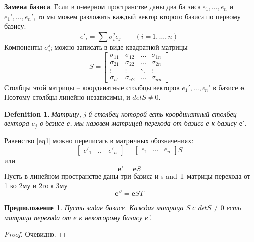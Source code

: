 \documentclass[11pt; a4paper]{report}
\theoremstyle{plain} %
\newtheorem{sug}{Предположение}[section]
\theoremstyle{defenition}
\newtheorem{glob_def}{Defenition}
\theoremstyle{remark}
\begin{document}
\textbf{Замена базиса.} Если в п-мерном пространстве даны два ба­ зиса  $e_1, \ldots, e_n$ и $e_1', \ldots, e_n'$, то мы можем разложить каждый вектор вто­рого базиса по первому базису:
\begin{equation}\label{eq1}
e'_i = \sum \sigma_i^je_j \qquad (i = 1, \ldots, n)
\end{equation}
Компоненты $\sigma_i^j$; можно записать в виде квадратной матрицы 
\begin{equation*}
S =  \begin{bmatrix}
		\sigma_{11} & \sigma_{12} &  \ldots & \sigma_{1n} \\
		\sigma_{21} & \sigma_{22} &  \ldots & \sigma_{2n} \\
		\vdots & \vdots & \ddots & \vdots \\
		\sigma_{n1} & \sigma_{n2} & \ldots & \sigma_{nn} 
	\end{bmatrix} 
\end{equation*}
Столбцы этой матрицы -- координатные столбцы векторов $e_1', \ldots, e_n'$ в базисе $\boldsymbol{e}$. Поэтому столбцы линейно независимы, и $det S \not= 0$.

\begin{glob_def}
Матрицу, j-й столбец которой есть координат­ный столбец вектора $e_j$ в базисе е, мы назовем матрицей перехода от базиса е к базису $е'$.
\end{glob_def}
Равенство \ref{eq1} можно переписать в матричных обозначениях: 
\begin{equation*}
\begin{bmatrix} e'_1 &  \ldots & e'_n \end{bmatrix} = \begin{bmatrix} e_1 &  \ldots & e_n \end{bmatrix} S
\end{equation*}
или 
\begin{equation}\label{eq6.1.2}
\boldsymbol{e'} = \boldsymbol{e} S
 \end{equation}
Пусть в линейном пространстве даны три базиса и s and T матрицы перехода от 1 ко 2му и 2го к 3му
\begin{equation}\label{eq6.3}
\boldsymbol{e''} = \boldsymbol{e} S T
\end{equation}
 
\begin{sug}\label{sug6.11}
Пусть задан базисе. Каждая матрица S с $det S \not=0$ есть матрица перехода от е к некоторому базису е'.\end{sug}
\begin{proof}
Очевидно.
\end{proof}
\end{document}
